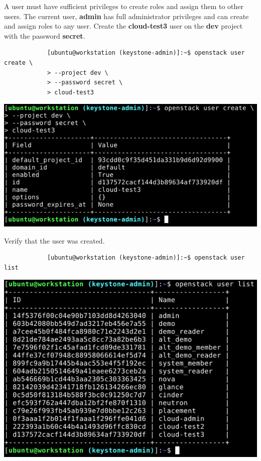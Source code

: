 \documentclass[letterpaper, 12pt]{article}
\begin{document}
\begin{enumerate}
    \begin{labstep}
        A user must have sufficient privileges to create roles and assign them to other users.
        The current user, \textbf{admin} has full administrator privileges and can create and assign roles to any user.
        Create the \textbf{cloud-test3} user on the \textbf{dev} project with the password \textbf{secret}.
        \begin{lstlisting}
            [ubuntu@workstation (keystone-admin)]:~$ openstack user create \
            > --project dev \
            > --password secret \
            > cloud-test3
        \end{lstlisting}

        \begin{center}
            \includegraphics[width=\linewidth]{images/part4/step4.png}
        \end{center}
    \end{labstep}

    \begin{labstep}
        Verify that the user was created.
        \begin{lstlisting}
            [ubuntu@workstation (keystone-admin)]:~$ openstack user list
        \end{lstlisting}

        \begin{center}
            \includegraphics[width=\linewidth]{images/part4/step5.png}
        \end{center}
    \end{labstep}


\end{enumerate}
\end{document}
